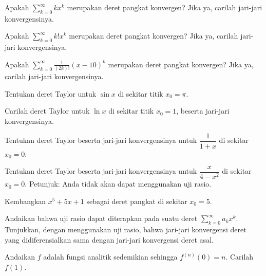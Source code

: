 \begin{exercise}
Apakah $\displaystyle \sum_{k=0}^\infty k x^k$ merupakan deret pangkat konvergen?
Jika ya, carilah jari-jari konvergensinya.
\end{exercise}

\begin{exercise}
Apakah $\displaystyle \sum_{k=0}^\infty k! x^k$ merupakan deret pangkat konvergen?
Jika ya, carilah jari-jari konvergensinya.
\end{exercise}

\begin{exercise}
Apakah $\displaystyle \sum_{k=0}^\infty \frac{1}{(2k)!} {(x-10)}^k$
merupakan deret pangkat konvergen? Jika ya, carilah jari-jari konvergensinya.
\end{exercise}

\begin{exercise}
Tentukan deret Taylor untuk $\sin x$ di sekitar titik $x_0 = \pi$.
\end{exercise}

\begin{exercise}
Carilah deret Taylor untuk $\ln x$ di sekitar titik $x_0 = 1$,
beserta jari-jari konvergensinya.
\end{exercise}

\begin{exercise}
Tentukan deret Taylor
beserta jari-jari konvergensinya untuk $\dfrac{1}{1+x}$
di sekitar $x_0 = 0$.
\end{exercise}

\begin{exercise}
Tentukan deret Taylor beserta jari-jari konvergensinya
untuk
$\dfrac{x}{4-x^2}$ di sekitar $x_0 = 0$. Petunjuk: Anda tidak akan dapat
menggunakan uji rasio.
\end{exercise}

\begin{exercise}
Kembangkan $x^5+5x+1$ sebagai deret pangkat di sekitar $x_0 = 5$.
\end{exercise}

\begin{exercise}
Andaikan bahwa uji rasio dapat diterapkan pada suatu deret
$\displaystyle \sum_{k=0}^\infty a_k x^k$. Tunjukkan, dengan menggunakan uji
rasio, bahwa jari-jari konvergensi deret yang didiferensialkan
sama dengan jari-jari konvergensi deret asal.
\end{exercise}

\begin{exercise}
Andaikan $f$ adalah fungsi analitik sedemikian sehingga
$f^{(n)}(0) = n$. Carilah $f(1)$.
\end{exercise}


